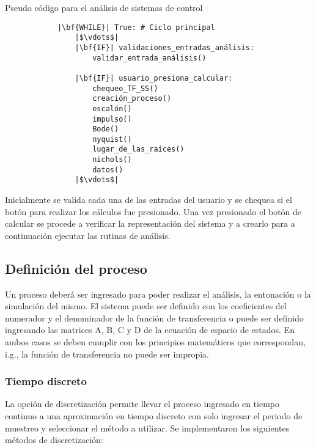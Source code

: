     \begin{longlisting}
        \caption[Pseudo código - Análisis de sistemas de control]{Pseudo código para el análisis de sistemas de control}
        \label{code:analisis}				
        \begin{verbatim}
            |\bf{WHILE}| True: # Ciclo principal
                |$\vdots$|
                |\bf{IF}| validaciones_entradas_análisis:
                    validar_entrada_análisis()
                
                |\bf{IF}| usuario_presiona_calcular:
                    chequeo_TF_SS()
                    creación_proceso()
                    escalón()
                    impulso()
                    Bode()
                    nyquist()
                    lugar_de_las_raíces()
                    nichols()
                    datos()
                |$\vdots$|
        \end{verbatim}
    \end{longlisting}

    Inicialmente se valida cada una de las entradas del usuario y se chequea si el botón para realizar los cálculos fue presionado. Una vez presionado el botón de calcular se procede a verificar la representación del sistema y a crearlo para a continuación ejecutar las rutinas de análisis.

    \subsection{Definición del proceso}

        Un proceso deberá ser ingresado para poder realizar el análisis, la entonación o la simulación del mismo. El sistema puede ser definido con los coeficientes del numerador y el denominador de la función de transferencia o puede ser definido ingresando las matrices A, B, C y D de la ecuación de espacio de estados. En ambos casos se deben cumplir con los principios matemáticos que correspondan, i.g., la función de transferencia no puede ser impropia.

    \subsubsection{Tiempo discreto}

        La opción de discretización permite llevar el proceso ingresado en tiempo continuo a una aproximación en tiempo discreto con solo ingresar el periodo de muestreo y seleccionar el método a utilizar. Se implementaron los siguientes métodos de discretización:

